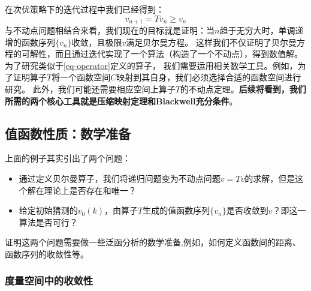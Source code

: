 在次优策略下的迭代过程中我们已经得到：
$$v_{n+1}=Tv_n \geq v_n$$
与不动点问题相结合来看，我们现在的目标就是证明：当$n$趋于无穷大时，单调递增的函数序列$\{v_n\}$收敛，且极限$v$满足贝尔曼方程。
这样我们不仅证明了贝尔曼方程的可解性，而且通过迭代实现了一个算法（构造了一个不动点），得到数值解。为了研究类似于\ref{eq-operator}定义的算子，
我们需要运用相关数学工具。例如，为了证明算子$T$将一个函数空间$C$映射到其自身，我们必须选择合适的函数空间进行研究。
此外，我们可能还需要相应空间上算子$T$的不动点定理。\textbf{后续将看到，我们所需的两个核心工具就是压缩映射定理和Blackwell充分条件}。


\subsection{值函数性质：数学准备} \label{subsec-math-pre}

上面的例子其实引出了两个问题：
\begin{itemize}
    \item 通过定义贝尔曼算子，我们将递归问题变为不动点问题$v=Tv$的求解，但是这个解在理论上是否存在和唯一？
    \item 给定初始猜测的$v_0\left(k\right)$，由算子$T$生成的值函数序列$\{v_n\}$是否收敛到$v$？即这一算法是否可行？
\end{itemize}

证明这两个问题需要做一些泛函分析的数学准备,例如，如何定义函数间的距离、函数序列的收敛性等。

\subsubsection{度量空间中的收敛性}

